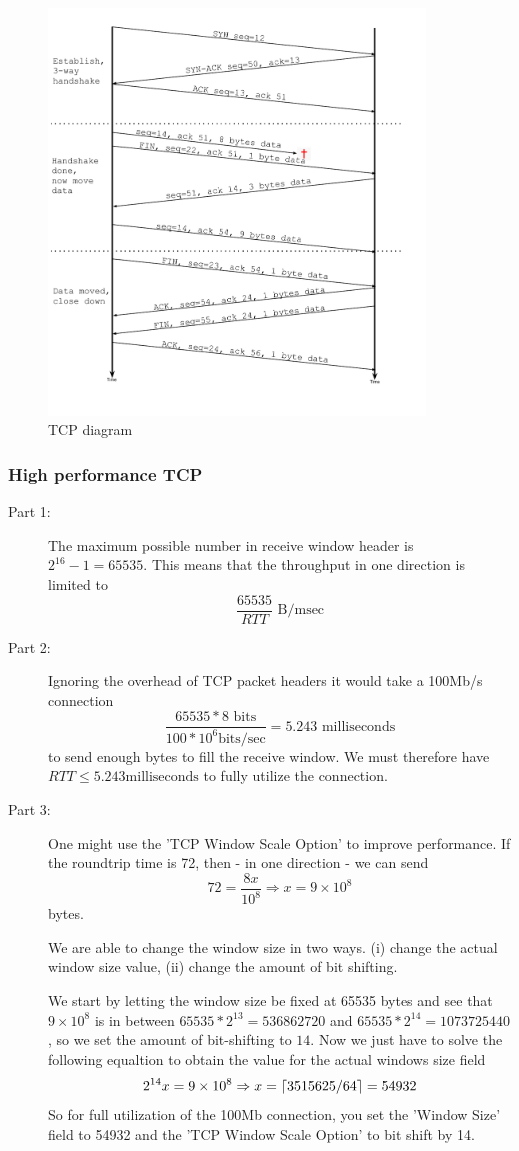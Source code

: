 \begin{description}
\begin{figure}[!h]
        \includegraphics[width=10cm]{131p3-pic}
        \caption{TCP diagram}
        \end{figure}
\end{description}

\subsubsection{High performance TCP}
\begin{description}
    \item[Part 1:] The maximum possible number in receive window header is
        $2^{16}-1 = 65535$. This means that the throughput in one direction is
        limited to \[\frac{65535}{RTT} \text{ B/msec}\]
    \item[Part 2:] Ignoring the overhead of TCP packet headers it would take a
        100Mb/s connection \[ \frac{65535 * 8 \text{ bits}}{100 * 10^{6} \text{
        bits/sec}} = 5.243 \text{ milliseconds} \] to send enough bytes to fill
        the receive window. We must therefore have $RTT \leq 5.243 \text{
        milliseconds}$ to fully utilize the connection.
    \item[Part 3:] One might use the 'TCP Window Scale Option' to improve performance.
        If the roundtrip time is 72, then - in one direction - we
        can send $$72=\frac{8x}{10^8} \Rightarrow x = 9 \times 10^8$$ bytes.
        
        We are able to change the window size in two ways. (i) change the
        actual window size value, (ii) change the amount of bit shifting.
        
        We start by letting the window size be fixed at 65535 bytes and see
        that $9\times10^8$ is in between $65535*2^{13}=536862720$ and
        $65535*2^{14}=1073725440$, so we set the amount of bit-shifting to
        $14$. Now we just have to solve the following equaltion to obtain
        the value for the actual windows size field $$2^{14}x=9\times10^8 \Rightarrow x=\left\lceil{3515625/64}\right\rceil = 54932$$
        So for full utilization of the 100Mb connection, you set the 'Window
        Size' field to 54932 and the 'TCP Window Scale Option' to bit shift by
        14.
\end{description}

